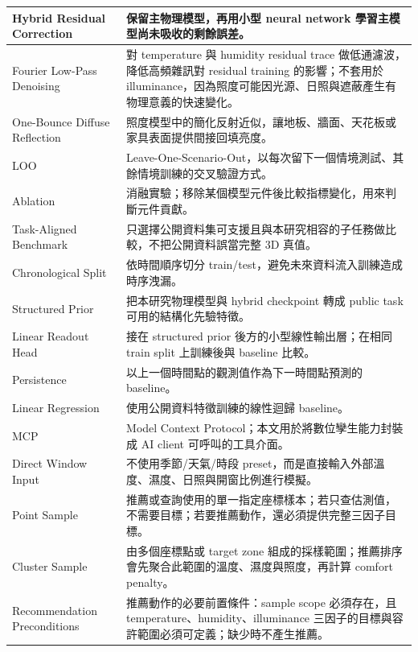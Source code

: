 \documentclass[12pt,a4paper]{article}
\begin{document}
{\begin{longtable}{|>{\raggedright\arraybackslash}p{}|>{\raggedright\arraybackslash}p{}|}
\hline
Hybrid Residual Correction & 保留主物理模型，再用小型 neural network 學習主模型尚未吸收的剩餘誤差。 \\
\hline
Fourier Low-Pass Denoising & 對 temperature 與 humidity residual trace 做低通濾波，降低高頻雜訊對 residual training 的影響；不套用於 illuminance，因為照度可能因光源、日照與遮蔽產生有物理意義的快速變化。 \\
\hline
One-Bounce Diffuse Reflection & 照度模型中的簡化反射近似，讓地板、牆面、天花板或家具表面提供間接回填亮度。 \\
\hline
LOO & Leave-One-Scenario-Out，以每次留下一個情境測試、其餘情境訓練的交叉驗證方式。 \\
\hline
Ablation & 消融實驗；移除某個模型元件後比較指標變化，用來判斷元件貢獻。 \\
\hline
Task-Aligned Benchmark & 只選擇公開資料集可支援且與本研究相容的子任務做比較，不把公開資料誤當完整 3D 真值。 \\
\hline
Chronological Split & 依時間順序切分 train/test，避免未來資料流入訓練造成時序洩漏。 \\
\hline
Structured Prior & 把本研究物理模型與 hybrid checkpoint 轉成 public task 可用的結構化先驗特徵。 \\
\hline
Linear Readout Head & 接在 structured prior 後方的小型線性輸出層；在相同 train split 上訓練後與 baseline 比較。 \\
\hline
Persistence & 以上一個時間點的觀測值作為下一時間點預測的 baseline。 \\
\hline
Linear Regression & 使用公開資料特徵訓練的線性迴歸 baseline。 \\
\hline
MCP & Model Context Protocol；本文用於將數位孿生能力封裝成 AI client 可呼叫的工具介面。 \\
\hline
Direct Window Input & 不使用季節/天氣/時段 preset，而是直接輸入外部溫度、濕度、日照與開窗比例進行模擬。 \\
\hline
Point Sample & 推薦或查詢使用的單一指定座標樣本；若只查估測值，不需要目標；若要推薦動作，還必須提供完整三因子目標。 \\
\hline
Cluster Sample & 由多個座標點或 target zone 組成的採樣範圍；推薦排序會先聚合此範圍的溫度、濕度與照度，再計算 comfort penalty。 \\
\hline
Recommendation Preconditions & 推薦動作的必要前置條件：sample scope 必須存在，且 temperature、humidity、illuminance 三因子的目標與容許範圍必須可定義；缺少時不產生推薦。 \\
\hline
\end{longtable}
}
\end{document}
